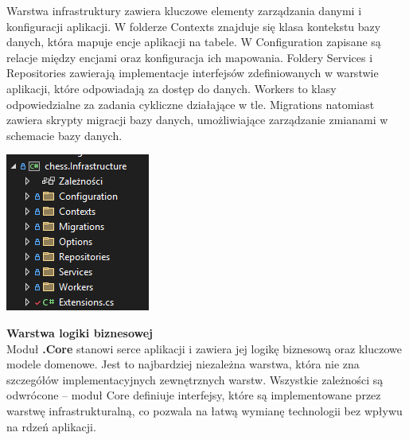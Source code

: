 \documentclass[12pt,a4paper]{article}
\begin{document}
\vspace{0.5cm}
\begin{minipage}[t]{0.45\textwidth}
    \vspace{0pt}
    \raggedright
    Warstwa infrastruktury zawiera kluczowe elementy zarządzania danymi i konfiguracji aplikacji. W folderze Contexts znajduje się klasa kontekstu bazy danych, która mapuje encje aplikacji na tabele. W Configuration zapisane są relacje między encjami oraz konfiguracja ich mapowania. Foldery Services i Repositories zawierają implementacje interfejsów zdefiniowanych w warstwie aplikacji, które odpowiadają za dostęp do danych. Workers to klasy odpowiedzialne za zadania cykliczne działające w tle. Migrations natomiast zawiera skrypty migracji bazy danych, umożliwiające zarządzanie zmianami w schemacie bazy danych.
\end{minipage}
\hfill
\begin{minipage}[t]{0.45\textwidth}
    \vspace{0pt}
    \centering
    \includegraphics[width=\linewidth]{images/struktura_back_infrastructure.png} 
\end{minipage}
\vspace{0.5cm}

\noindent \textbf{Warstwa logiki biznesowej}\\
Moduł \textbf{.Core} stanowi serce aplikacji i zawiera jej logikę biznesową oraz kluczowe modele domenowe. Jest to najbardziej niezależna warstwa, która nie zna szczegółów implementacyjnych zewnętrznych warstw. Wszystkie zależności są odwrócone – moduł Core definiuje interfejsy, które są implementowane przez warstwę infrastrukturalną, co pozwala na łatwą wymianę technologii bez wpływu na rdzeń aplikacji.
\end{document}
